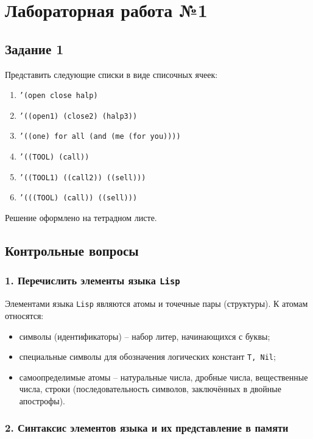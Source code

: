 \chapter*{Лабораторная работа №1}

\section*{Задание 1}

Представить следующие списки в виде списочных ячеек:
\begin{enumerate}
	\item {\texttt{'(open close halp)}}
	\item {\texttt{'((open1) (close2) (halp3))}}
	\item {\texttt{'((one) for all (and (me (for you))))}}
	\item {\texttt{'((TOOL) (call))}}
	\item {\texttt{'((TOOL1) ((call2)) ((sell)))}}
	\item {\texttt{'(((TOOL) (call)) ((sell)))}}
\end{enumerate}

Решение оформлено на тетрадном листе.

\section*{Контрольные вопросы}

\subsection*{1. Перечислить элементы языка {\texttt{Lisp}}}

Элементами языка {\texttt{Lisp}} являются атомы и точечные пары (структуры). К атомам относятся:
\begin{itemize}
	\item символы (идентификаторы) -- набор литер, начинающихся с буквы;
	\item специальные символы для обозначения логических констант {\texttt{T,~Nil}};
	\item самоопределимые атомы -- натуральные числа, дробные числа, вещественные числа, строки (последовательность символов, заключённых в двойные апострофы).
\end{itemize}

\subsection*{2. Синтаксис элементов языка и их представление в памяти}

